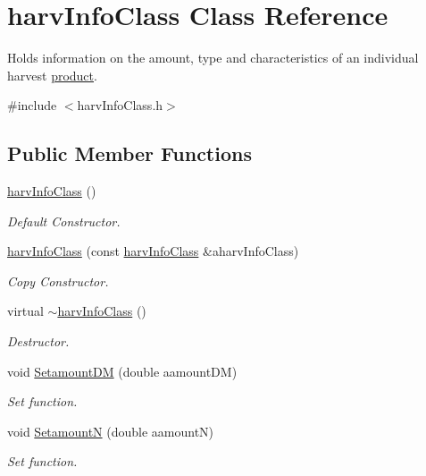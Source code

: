 \hypertarget{classharv_info_class}{
\section{harvInfoClass Class Reference}
\label{classharv_info_class}
}


Holds information on the amount, type and characteristics of an individual harvest \hyperlink{classproduct}{product}.  


{\ttfamily \#include $<$harvInfoClass.h$>$}\subsection*{Public Member Functions}
\begin{DoxyCompactItemize}
\item 
\hyperlink{classharv_info_class_a8ac8ed72179f9ebae816c3eec0cacb2d}{harvInfoClass} ()
\begin{DoxyCompactList}\small\item\em Default Constructor. \item\end{DoxyCompactList}\item 
\hyperlink{classharv_info_class_a137ea57a9a1bd2fb6ade546eec085114}{harvInfoClass} (const \hyperlink{classharv_info_class}{harvInfoClass} \&aharvInfoClass)
\begin{DoxyCompactList}\small\item\em Copy Constructor. \item\end{DoxyCompactList}\item 
virtual \hyperlink{classharv_info_class_ae0fbc3cf9b27de7cc3f9357691243a71}{$\sim$harvInfoClass} ()
\begin{DoxyCompactList}\small\item\em Destructor. \item\end{DoxyCompactList}\item 
void \hyperlink{classharv_info_class_a65627109413ccce8e91f747a63d8bbad}{SetamountDM} (double aamountDM)
\begin{DoxyCompactList}\small\item\em Set function. \item\end{DoxyCompactList}\item 
void \hyperlink{classharv_info_class_a903f84ea29f54cdbca6df9661a6db9b5}{SetamountN} (double aamountN)
\begin{DoxyCompactList}\small\item\em Set function. \item\end{DoxyCompactList}\item 

\end{DoxyCompactItemize}
